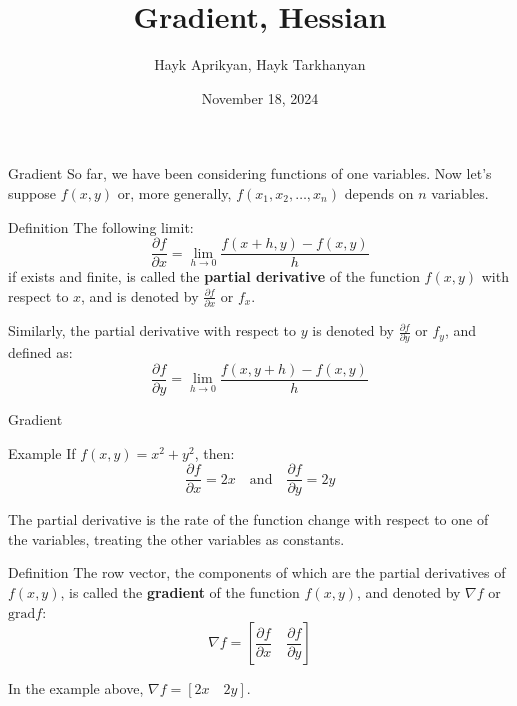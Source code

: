 \documentclass{beamer}
\title[Lecture 7]{Gradient, Hessian}
\author[Aprikyan, Tarkhanyan]{Hayk Aprikyan, Hayk Tarkhanyan}
\institute[ACA]{Armenian Code Academy}
\date{November 18, 2024}
\begin{document}
\begin{frame}
  \titlepage
\end{frame}





\begin{frame}{Gradient}
So far, we have been considering functions of one variables. Now let's suppose $f(x,y)$ or, more generally, $f(x_1,x_2,\dots,x_n)$ depends on $n$ variables.
\pause
  \begin{block}{Definition}
        The following limit:
        \[
        \frac{\partial f}{\partial x} = \lim_{{h \to 0}} \frac{f(x + h, y) - f(x, y)}{h}
        \]
        if exists and finite, is called the \textbf{partial derivative} of the function \(f(x, y)\) with respect to \(x\), and is denoted by $\frac{\partial f}{\partial x}$ or $f_x$.
        
        Similarly, the partial derivative with respect to \(y\) is denoted by \(\frac{\partial f}{\partial y}\) or $f_y$, and defined as:
        \[
        \frac{\partial f}{\partial y} = \lim_{{h \to 0}} \frac{f(x,y + h) - f(x, y)}{h}
        \]
    \end{block}


\end{frame}


\begin{frame}{Gradient}

    \begin{exampleblock}{Example}
        If \(f(x, y) = x^2 + y^2\), then:
        \[
        \frac{\partial f}{\partial x} = 2x \quad \text{and} \quad \frac{\partial f}{\partial y} = 2y
        \]
    \end{exampleblock}
\pause 
        The partial derivative is the rate of the function change with respect to one of the variables, treating the other variables as constants.
\pause
 \begin{block}{Definition}
        The row vector, the components of which are the partial derivatives of $f(x,y)$, is called the \textbf{gradient} of the function \(f(x, y)\), and denoted by \(\nabla f\) or $\text{grad} f$:
        \[
        \nabla f = \left[\frac{\partial f}{\partial x}\quad  \frac{\partial f}{\partial y}\right]
        \]
    \end{block}
In the example above, $        \nabla f = [2x\quad 2y]$.

\end{frame}
\end{document}
